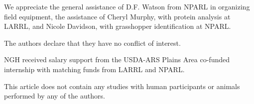\documentclass[referee, 
	            sn-basic]
           {sn-jnl}
\begin{document}
\begin{linenumbers}

We appreciate the general assistance of D.F. Watson from NPARL in organizing field equipment, the assistance of Cheryl Murphy, with protein analysis at LARRL, and Nicole Davidson, with grasshopper identification at NPARL. 



The authors declare that they have no conflict of interest.


NGH received salary support from the USDA-ARS Plains Area co-funded internship with matching funds from LARRL and NPARL. 


This article does not contain any studies with human participants or animals performed by any of the authors.  



\end{linenumbers}
\end{document}
